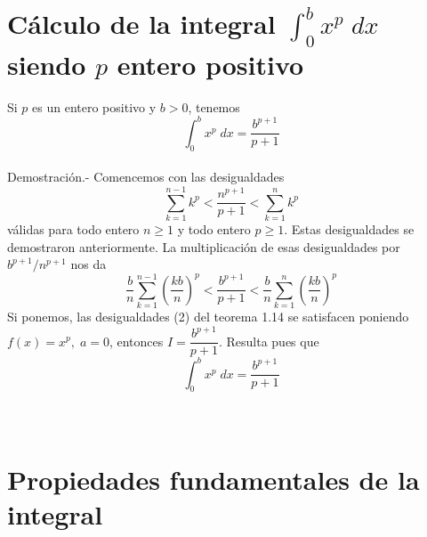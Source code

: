 \section{Cálculo de la integral $\int_0^b x^p \; dx$ siendo $p$ entero positivo}

\begin{teo} Si $p$ es un entero positivo y $b>0$, tenemos $$\int_0^b x^p \; dx = \dfrac{b^{p+1}}{p+1}$$\\
    Demostración.-\; Comencemos con las desigualdades $$\sum\limits_{k=1}^{n-1} k^p < \dfrac{n^{p+1}}{p+1}<\sum\limits_{k=1}^n k^p$$
    válidas para todo entero $n\geq 1$ y todo entero $p\geq 1$. Estas desigualdades se demostraron anteriormente. La multiplicación de esas desigualdades por $b^{p+1}/n^{p+1}$ nos da $$\dfrac{b}{n} \sum\limits_{k=1}^{n-1} \left(\dfrac{kb}{n}\right)^p<\dfrac{b^{p+1}}{p+1}<\dfrac{b}{n}\sum\limits_{k=1}^{n}\left(\dfrac{kb}{n}\right)^p$$
    Si ponemos, las desigualdades (2) del teorema 1.14 se satisfacen poniendo $f(x)=x^p, \;a=0$, entonces $I=\dfrac{b^{p+1}}{p+1}$. Resulta pues que $$\int_0^b x^p \; dx=\dfrac{b^{p+1}}{p+1}$$\\\\
\end{teo}


\section{Propiedades fundamentales de la integral}

